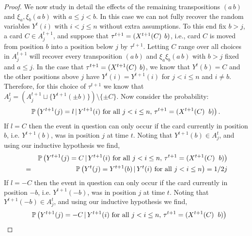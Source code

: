 \documentclass[11pt]{report}
\begin{document}
\begin{proof}
	We now study in detail the effects of the remaining transpositions $(a \, b)$ and $\xi_{a},\xi_{b}(a \,b)$ with $a\leq j<b$.
	In this case  we can not fully recover the random variables $Y^{t}(i)$ with $i < j \leq n$ without extra assumptions. To this end fix $b>j$,  a card $C \in A_{j}^{t+1}$, and suppose that $\tau^{t+1} = (X^{t+1}(C) \hspace{0.15cm} b)$, i.e., card $C$ is moved from position $b$ into a position below $j$ by $\tau^{t+1}$. Letting $C$ range over all choices in $A_{j}^{t+1}$ will recover every transposition $(a \, b)$ and $\xi_{a}\xi_{b} (a \, b)$ with $b>j$ fixed and  $a\leq j$. In the case that  $\tau^{t+1} = (X^{t+1}(C) \hspace{0.15cm} b)$, we know that $Y^{t}(b) = C$ and the other positions above $j$ have $Y^{t}(i) = Y^{t+1}(i)$ for $j < i \leq n$ and $i \neq b$.  Therefore, for this choice of $\tau^{t+1}$ we know that $A_{j}^{t} = \left(A_{j}^{t+1} \sqcup \{Y^{t+1}(\pm b)\} \right) \setminus \{\pm C\}$. Now consider the probability:
	\begin{eqnarray}
	\mathbb{P}\left(Y^{t+1}(j) = l \, | \, Y^{t+1}(i) \textnormal{ for all } j < i \leq n , \, \tau^{t+1} = (X^{t+1}(C) \hspace{0.2cm} b)\right) \nonumber.
	\end{eqnarray}
	If $l = C$ then the event in question can only occur if  the card currently in position $b$, i.e. $Y^{t+1}(b)$, was in position $j$ at time $t$. Noting that $Y^{t+1}(b) \in A_{j}^{t}$, and using our inductive hypothesis we find,
	\begin{eqnarray}
	& & \mathbb{P}\left(Y^{t+1}(j) = C \, | \, Y^{t+1}(i) \textnormal{ for all } j < i \leq n , \, \tau^{t+1} = (X^{t+1}(C) \hspace{0.2cm} b)\right) \nonumber \\
	& = & \mathbb{P}\left(Y^{t}(j) = Y^{t+1}(b) \, | \, Y^{t}(i) \textnormal{ for all } j < i \leq n  \right) = 1/2j \label{chpt5:eqn:SSThardind1}
	\end{eqnarray}
	If $l = -C$ then the event in question can only occur if the card currently in position $-b$, i.e. $Y^{t+1}(-b)$, was in position $j$ at time $t$. Noting that $Y^{t+1}(-b) \in A_{j}^{t}$, and using our inductive hypothesis we find,
	\begin{eqnarray}
	& & \mathbb{P}\left(Y^{t+1}(j) = -C \, | \, Y^{t+1}(i) \textnormal{ for all } j < i \leq n , \, \tau^{t+1} = (X^{t+1}(C) \hspace{0.2cm} b)\right) \nonumber \\

\end{eqnarray}
\end{proof}
\end{document}
